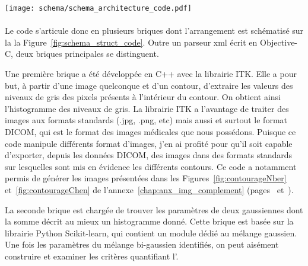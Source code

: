 \documentclass[main.tex]{subfiles}
\begin{document}
\begin{sidewaysfigure}
\centering
\vfill
\texttt{[image: schema/schema\_architecture\_code.pdf]} %
\caption{\label{fig:schema_struct_code}Schéma du code de calcul permettant la quantification de l'\hetero. Le code est très hétéroclite et fait intervenir plusieurs langages de programmation}
\end{sidewaysfigure}


\paragraph{}
Le code s'articule donc en plusieurs briques dont l'arrangement est schématisé sur la la Figure~\ref{fig:schema_struct_code}. Outre un parseur xml écrit en Objective-C, deux briques principales se distinguent. 


Une première brique a été développée en C++ avec la librairie ITK. 
Elle a pour but, à partir d'une image quelconque 
 et d'un contour, d'extraire les valeurs des niveaux de gris des pixels présents à l'intérieur du contour. On obtient ainsi l'histogramme des niveaux de gris. 
La librairie ITK a l'avantage de traiter des images aux formats standards (.jpg, .png, etc) mais aussi et surtout le format DICOM, qui est le format des images médicales que nous possédons. 
Puisque ce code manipule différents format d'images, j'en ai profité pour qu'il soit capable d'exporter, depuis les données DICOM, des images dans des formats standards sur lesquelles sont mis en évidence les différents contours. 
Ce code a notamment permis de générer les images présentées dans les Figures~\ref{fig:contourageNber} et~\ref{fig:contourageChen} de l'annexe~\ref{chap:anx_img_complement} (pages~\pageref{fig:contourageNber}  et~\pageref{fig:contourageNber}).


La seconde brique est chargée de trouver les paramètres de deux gaussiennes dont la somme décrit au mieux un histogramme donné. 
Cette brique est basée sur la librairie Python Scikit-learn, qui contient un module dédié au mélange gaussien. Une fois les paramètres du mélange bi-gaussien identifiés, on peut aisément construire et examiner les critères quantifiant l'\hetero.
\end{document}
